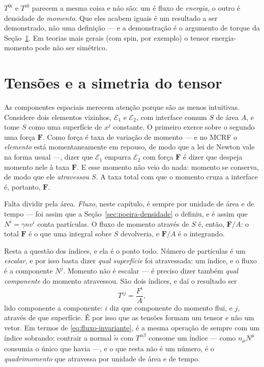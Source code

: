 \documentclass[12pt,a4paper,oneside]{book}
\theoremstyle{rgplain}
\theoremstyle{rgremark}
\begin{document}
\begin{atencao}
$T^{0i}$ e $T^{i0}$ parecem a mesma coisa e não são: um é fluxo de
\emph{energia}, o outro é densidade de \emph{momento}. Que eles acabem iguais
é um resultado a ser demonstrado, não uma definição --- e a demonstração é o
argumento de torque da Seção~\ref{sec:simetria-T}. Em teorias mais gerais
(com spin, por exemplo) o tensor energia-momento pode não ser simétrico.
\end{atencao}

\section{Tensões e a simetria do tensor}
\label{sec:simetria-T}

As componentes espaciais merecem atenção porque são as menos intuitivas.
Considere dois elementos vizinhos, $\mathcal{E}_1$ e $\mathcal{E}_2$, com
interface comum $S$ de área $A$, e tome $S$ como uma superfície de $x^j$
constante. O primeiro exerce sobre o segundo uma força $\bm F$. Como força é
taxa de variação de momento --- e no MCRF o \emph{elemento} está
momentaneamente em repouso, de modo que a lei de Newton vale na forma usual
---, dizer que $\mathcal{E}_1$ empurra $\mathcal{E}_2$ com força $\bm F$ é
dizer que despeja momento nele à taxa $\bm F$. E esse momento
não veio do nada: momento se conserva, de modo que ele \emph{atravessou} $S$.
A taxa total com que o momento cruza a interface é, portanto, $\bm F$.

Falta dividir pela área. \emph{Fluxo}, neste capítulo, é sempre por unidade de
área e de tempo --- foi assim que a Seção~\ref{sec:poeira-densidade} o
definiu, e é assim que $N^i=\gamma n v^i$ conta partículas. O fluxo de momento
através de $S$ é, então, $\bm F/A$: o total $\bm F$ é o que uma integral sobre
$S$ devolveria, e $\bm F/A$ é o integrando.

Resta a questão dos índices, e ela é o ponto todo. Número de partículas é um
\emph{escalar}, e por isso basta dizer \emph{qual superfície} foi atravessada:
um índice, e o fluxo é a componente $N^j$. Momento não é escalar --- é preciso
dizer também \emph{qual componente} do momento atravessou. São dois índices, e
daí o resultado ser
\begin{equation}
  T^{ij}=\frac{F^{i}}{A} ,
  \label{eq:tensao-forca-area}
\end{equation}
lido componente a componente: $i$ diz que componente do momento flui, e $j$,
através de que superfície. É por isso que as tensões formam um tensor e não um
vetor. Em termos de \eqref{eq:fluxo-invariante}, é a mesma operação de sempre
com um índice sobrando: contrair a normal $\tilde n$ com $T^{\alpha\beta}$
consome um índice --- como $n_\mu N^\mu$ consumia o único que havia ---, e o
que resta não é um número, é o \emph{quadrimomento} que atravessa por unidade
de área e de tempo.
\end{document}
